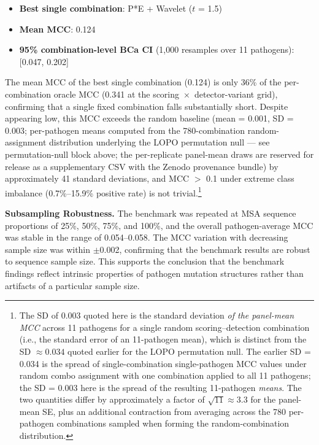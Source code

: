 \begin{itemize}
\item \textbf{Best single combination}: P*E + Wavelet ($t$ = 1.5)
\item \textbf{Mean MCC}: 0.124
\item \textbf{95\% combination-level BCa CI} (1{,}000 resamples over 11 pathogens): [0.047, 0.202]
\end{itemize}

The mean MCC of the best single combination (0.124) is only 36\% of the per-combination oracle MCC (0.341 at the scoring~$\times$~detector-variant grid), confirming that a single fixed combination falls substantially short. Despite appearing low, this MCC exceeds the random baseline (mean = 0.001, SD = 0.003; per-pathogen means computed from the 780-combination random-assignment distribution underlying the LOPO permutation null --- see permutation-null block above; the per-replicate panel-mean draws are reserved for release as a supplementary CSV with the Zenodo provenance bundle) by approximately 41 standard deviations, and MCC $>$ 0.1 under extreme class imbalance (0.7\%--15.9\% positive rate) is not trivial.\footnote{The SD of 0.003 quoted here is the standard deviation \emph{of the panel-mean MCC} across 11 pathogens for a single random scoring--detection combination (i.e., the standard error of an 11-pathogen mean), which is distinct from the SD $\approx 0.034$ quoted earlier for the LOPO permutation null. The earlier SD = 0.034 is the spread of single-combination single-pathogen MCC values under random combo assignment with one combination applied to all 11 pathogens; the SD = 0.003 here is the spread of the resulting 11-pathogen \emph{means}. The two quantities differ by approximately a factor of $\sqrt{11} \approx 3.3$ for the panel-mean SE, plus an additional contraction from averaging across the 780 per-pathogen combinations sampled when forming the random-combination distribution.}

\textbf{Subsampling Robustness.}
\label{subsec:9pathogen_subsampling}
The benchmark was repeated at MSA sequence proportions of 25\%, 50\%, 75\%, and 100\%, and the overall pathogen-average MCC was stable in the range of 0.054--0.058.
The MCC variation with decreasing sample size was within $\pm$0.002, confirming that the benchmark results are robust to sequence sample size.
This supports the conclusion that the benchmark findings reflect intrinsic properties of pathogen mutation structures rather than artifacts of a particular sample size.

